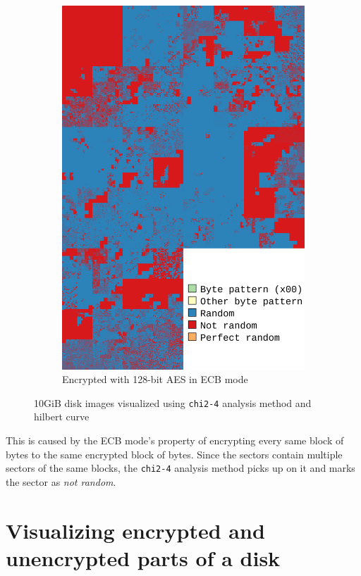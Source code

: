 \documentclass[
  digital, %
  color,   %
  oneside, %
  lof,     %
  nolot,     %
]{fithesis4}
\begin{document}
\begin{figure}
\begin{subfigure}[t]{.45\textwidth}
        \includegraphics[width=\textwidth,interpolate=false]{ubnt-test-aes-128-ecb-chi2-4-hilbert-legend.png}
        \caption{Encrypted with 128-bit AES in ECB mode}
        \label{fig:bad-enc-enc}
     \end{subfigure}
    \caption{10GiB disk images visualized using \texttt{chi2-4} analysis method and hilbert curve}
    \label{fig:bad-enc-fig}
\end{figure}

This is caused by the ECB mode's property of encrypting every same block of bytes to the same encrypted block of bytes.
Since the sectors contain multiple sectors of the same blocks, the \texttt{chi2-4} analysis method picks up on it and marks the sector as \emph{not random}.

\section{Visualizing encrypted and unencrypted parts of a disk}
\label{sec:visualizing-encrypted-and-unencrypted-parts-of-a-disk}
\end{document}
